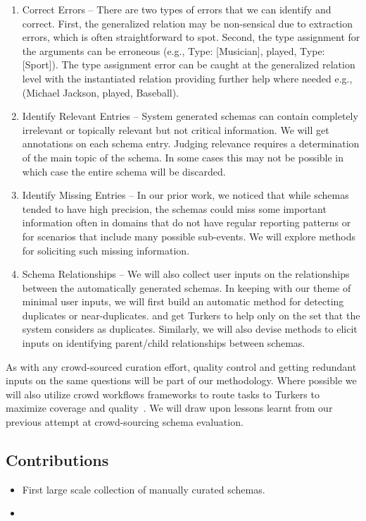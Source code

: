 \begin{enumerate}
\item {Correct Errors} -- There are two types of errors that we can identify and correct. First, the generalized relation may be non-sensical due to extraction errors, which is often straightforward to spot. Second, the type assignment for the arguments can be erroneous (e.g., Type: [Musician], played, Type: [Sport]). The type assignment error can be caught at the generalized relation level with the instantiated relation providing further help where needed e.g., (Michael Jackson, played, Baseball).
\item {Identify Relevant Entries} -- System generated schemas can contain completely irrelevant or topically relevant but not critical information. We will get annotations on each schema entry. Judging relevance requires a determination of the main topic of the schema. In some cases this may not be possible in which case the entire schema will be discarded.
\item {Identify Missing Entries} -- In our prior work, we noticed that while schemas tended to have high precision, the schemas could miss some important information often in domains that do not have regular reporting patterns or for scenarios that include many possible sub-events. We will explore methods for soliciting such missing information.
\item {Schema Relationships} -- We will also collect user inputs on the relationships between the automatically generated schemas. 
In keeping with our theme of minimal user inputs, we will first build an automatic method for detecting duplicates or near-duplicates.  
and get Turkers to help only on the set that the system considers as duplicates. Similarly, we will also devise methods to elicit inputs on identifying parent/child relationships between schemas.   
\end{enumerate}

As with any crowd-sourced curation effort, quality control and getting redundant inputs on the same questions will be part of our methodology. Where possible we will also utilize crowd workflows frameworks to route tasks to Turkers to maximize coverage and quality~\cite{}. We will draw upon lessons learnt from our previous attempt at crowd-sourcing schema evaluation.

\subsection{Contributions}

\begin{itemize}
\item First large scale collection of manually curated schemas. 
\item 
\end{itemize}
